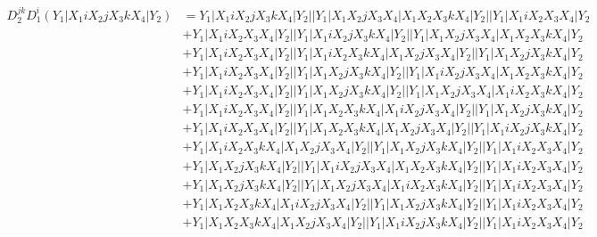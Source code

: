 \documentclass{article}[12pt]
\begin{document}
\begin{align*}
D_2^{jk}D_1^i(Y_1|X_1iX_2jX_3kX_4|Y_2)& =Y_1|X_1iX_2jX_3kX_4|Y_2||Y_1|X_1X_2jX_3X_4|X_1X_2X_3kX_4|Y_2||Y_1|X_1iX_2X_3X_4|Y_2\\ 
 & +Y_1|X_1iX_2X_3X_4|Y_2||Y_1|X_1iX_2jX_3kX_4|Y_2||Y_1|X_1X_2jX_3X_4|X_1X_2X_3kX_4|Y_2\\ 
 & +Y_1|X_1iX_2X_3X_4|Y_2||Y_1|X_1iX_2X_3kX_4|X_1X_2jX_3X_4|Y_2||Y_1|X_1X_2jX_3kX_4|Y_2\\ 
 & +Y_1|X_1iX_2X_3X_4|Y_2||Y_1|X_1X_2jX_3kX_4|Y_2||Y_1|X_1iX_2jX_3X_4|X_1X_2X_3kX_4|Y_2\\ 
 & +Y_1|X_1iX_2X_3X_4|Y_2||Y_1|X_1X_2jX_3kX_4|Y_2||Y_1|X_1X_2jX_3X_4|X_1iX_2X_3kX_4|Y_2\\ 
 & +Y_1|X_1iX_2X_3X_4|Y_2||Y_1|X_1X_2X_3kX_4|X_1iX_2jX_3X_4|Y_2||Y_1|X_1X_2jX_3kX_4|Y_2\\ 
 & +Y_1|X_1iX_2X_3X_4|Y_2||Y_1|X_1X_2X_3kX_4|X_1X_2jX_3X_4|Y_2||Y_1|X_1iX_2jX_3kX_4|Y_2\\ 
 & +Y_1|X_1iX_2X_3kX_4|X_1X_2jX_3X_4|Y_2||Y_1|X_1X_2jX_3kX_4|Y_2||Y_1|X_1iX_2X_3X_4|Y_2\\ 
 & +Y_1|X_1X_2jX_3kX_4|Y_2||Y_1|X_1iX_2jX_3X_4|X_1X_2X_3kX_4|Y_2||Y_1|X_1iX_2X_3X_4|Y_2\\ 
 & +Y_1|X_1X_2jX_3kX_4|Y_2||Y_1|X_1X_2jX_3X_4|X_1iX_2X_3kX_4|Y_2||Y_1|X_1iX_2X_3X_4|Y_2\\ 
 & +Y_1|X_1X_2X_3kX_4|X_1iX_2jX_3X_4|Y_2||Y_1|X_1X_2jX_3kX_4|Y_2||Y_1|X_1iX_2X_3X_4|Y_2\\ 
 & +Y_1|X_1X_2X_3kX_4|X_1X_2jX_3X_4|Y_2||Y_1|X_1iX_2jX_3kX_4|Y_2||Y_1|X_1iX_2X_3X_4|Y_2\end{align*}
\end{document}
